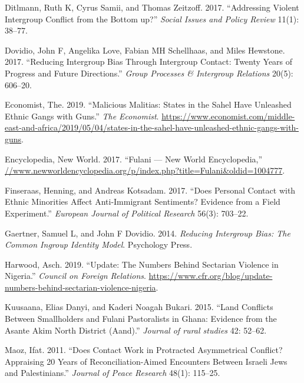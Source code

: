 \documentclass[11pt]{article}
\begin{document}
\leavevmode\hypertarget{ref-ditlmann2017addressing}{}%
Ditlmann, Ruth K, Cyrus Samii, and Thomas Zeitzoff. 2017. ``Addressing
Violent Intergroup Conflict from the Bottom up?'' \emph{Social Issues
and Policy Review} 11(1): 38--77.

\leavevmode\hypertarget{ref-dovidio2017reducing}{}%
Dovidio, John F, Angelika Love, Fabian MH Schellhaas, and Miles
Hewstone. 2017. ``Reducing Intergroup Bias Through Intergroup Contact:
Twenty Years of Progress and Future Directions.'' \emph{Group Processes
\& Intergroup Relations} 20(5): 606--20.

\leavevmode\hypertarget{ref-economist2019militias}{}%
Economist, The. 2019. ``Malicious Malitias: States in the Sahel Have
Unleashed Ethnic Gangs with Guns.'' \emph{The Economist}.
\url{https://www.economist.com/middle-east-and-africa/2019/05/04/states-in-the-sahel-have-unleashed-ethnic-gangs-with-guns}.

\leavevmode\hypertarget{ref-fulanisize2017}{}%
Encyclopedia, New World. 2017. ``Fulani --- New World Encyclopedia,''
\url{//www.newworldencyclopedia.org/p/index.php?title=Fulani\&oldid=1004777}.

\leavevmode\hypertarget{ref-finseraas2017does}{}%
Finseraas, Henning, and Andreas Kotsadam. 2017. ``Does Personal Contact
with Ethnic Minorities Affect Anti-Immigrant Sentiments? Evidence from a
Field Experiment.'' \emph{European Journal of Political Research} 56(3):
703--22.

\leavevmode\hypertarget{ref-gaertner2014reducing}{}%
Gaertner, Samuel L, and John F Dovidio. 2014. \emph{Reducing Intergroup
Bias: The Common Ingroup Identity Model}. Psychology Press.

\leavevmode\hypertarget{ref-council2019nigeria}{}%
Harwood, Asch. 2019. ``Update: The Numbers Behind Sectarian Violence in
Nigeria.'' \emph{Council on Foreign Relations}.
\url{https://www.cfr.org/blog/update-numbers-behind-sectarian-violence-nigeria}.

\leavevmode\hypertarget{ref-kuusaana2015land}{}%
Kuusaana, Elias Danyi, and Kaderi Noagah Bukari. 2015. ``Land Conflicts
Between Smallholders and Fulani Pastoralists in Ghana: Evidence from the
Asante Akim North District (Aand).'' \emph{Journal of rural studies} 42:
52--62.

\leavevmode\hypertarget{ref-maoz2011protracted}{}%
Maoz, Ifat. 2011. ``Does Contact Work in Protracted Asymmetrical
Conflict? Appraising 20 Years of Reconciliation-Aimed Encounters Between
Israeli Jews and Palestinians.'' \emph{Journal of Peace Research} 48(1):
115--25.
\end{document}
